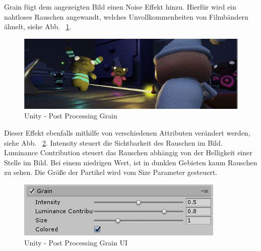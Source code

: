 Grain fügt dem angezeigten Bild einen Noise Effekt hinzu.
Hierfür wird ein nahtloses Rauschen angewandt, welches Unvollkommenheiten von Filmbändern ähnelt, siehe Abb. ~\ref{fig:unity-post-processing-grain}.
\begin {figure}
    \centering
    \includegraphics[scale=0.9]{pics/unity-post-processing-grain-on}
    \caption{Unity - Post Processing Grain}
    \label{fig:unity-post-processing-grain}
\end {figure}
Dieser Effekt ebenfalls mithilfe von verschiedenen Attributen verändert werden, siehe Abb. ~\ref{fig:unity-post-processing-grain-ui}.
Intensity steuert die Sichtbarkeit des Rauschen im Bild.
Luminance Contribution steuert das Rauschen abhängig von der Helligkeit einer Stelle im Bild.
Bei einem niedrigen Wert, ist in dunklen Gebieten kaum Rauschen zu sehen.
Die Größe der Partikel wird vom Size Parameter gesteuert.
\begin {figure}
    \centering
    \includegraphics[scale=0.9]{pics/unity-post-processing-grain-ui}
    \caption{Unity - Post Processing Grain UI}
    \label{fig:unity-post-processing-grain-ui}
\end {figure}
~\cite{Unity_Post_Processing_Grain_2022}

